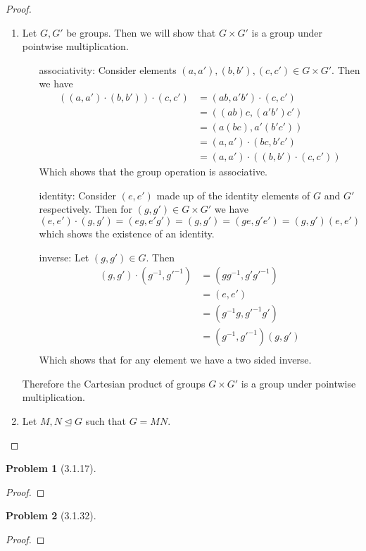 \documentclass[10pt]{article}
\newcommand{\sk}{\vskip 10mm}
\theoremstyle{plain}
\newtheorem{problem}{Problem}
\theoremstyle{remark}
\begin{document}
\begin{proof}
  \begin{enumerate}
  \item Let $G,G'$ be groups. Then we will show that $G\times G'$ is a group
    under pointwise multiplication.

    \begin{enumerate}
    \item[associativity:] Consider elements $(a,a'),(b,b'),(c,c')\in G\times G'$.
      Then we have
      \begin{align*}
        ((a,a')\cdot(b,b'))\cdot(c,c')&=(ab,a'b')\cdot(c,c')\\
                              &=((ab)c,(a'b')c')\\
                              &= (a(bc),a'(b'c'))\\
                              &=(a,a')\cdot(bc,b'c')\\
                              &=(a,a')\cdot((b,b')\cdot(c,c'))
      \end{align*}
      Which shows that the group operation is associative.
    \item[identity:] Consider $(e,e')$ made up of the identity elements of
      $G$ and $G'$ respectively. Then for $(g,g')\in G\times G'$ we have
      \[ (e,e')\cdot(g,g')=(eg,e'g')=(g,g')=(ge,g'e')=(g,g')(e,e')\]
      which shows the existence of an identity.
    \item[inverse:] Let $(g,g')\in G$. Then 
      \begin{align*}
        (g,g')\cdot(g^{-1},g'^{-1}) &=(gg^{-1},g'g'^{-1})\\
                                &=(e,e')\\
                                &=(g^{-1}g,g'^{-1}g')\\
                                &=(g^{-1},g'^{-1})(g,g')\\
      \end{align*}
      Which shows that for any element we have a two sided inverse.
    \end{enumerate}
    Therefore the Cartesian product of groups $G\times G'$ is a group under pointwise
    multiplication.

  \item Let $M,N\trianglelefteq G$  such that $G=MN$.
  \end{enumerate}
\end{proof}

\sk

\begin{problem}[3.1.17] %
  
\end{problem}

\begin{proof}
  
\end{proof}

\sk

\begin{problem}[3.1.32] %
  
\end{problem}

\begin{proof}
  
\end{proof}

\sk

\end{document}
